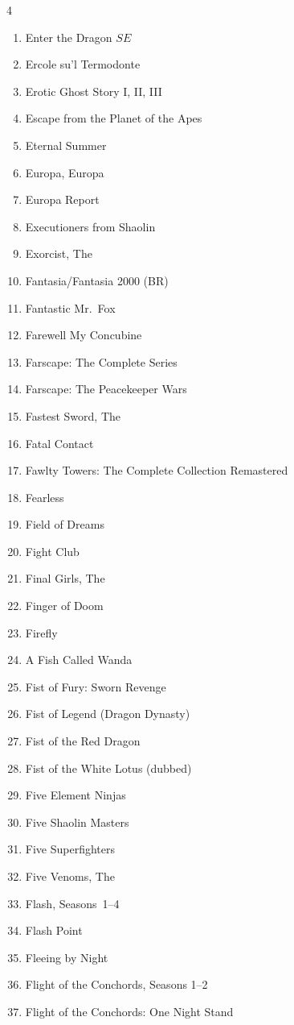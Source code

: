 \documentclass{article}
\newcommand\SE{\(SE\)}
\begin{document}
\begin{multicols}{4}
\begin{enumerate}
\item Enter the Dragon \SE
\item Ercole su'l Termodonte
\item Erotic Ghost Story I, II, III
\item Escape from the Planet of the Apes
\item Eternal Summer
\item Europa, Europa
\item Europa Report
\item Executioners from Shaolin
\item Exorcist, The
\item Fantasia/Fantasia 2000 (BR)
\item Fantastic Mr.~Fox
\item Farewell My Concubine
\item Farscape: The Complete Series
\item Farscape: The Peacekeeper Wars
\item Fastest Sword, The
\item Fatal Contact
\item Fawlty Towers: The Complete Collection Remastered
\item Fearless
\item Field of Dreams
\item Fight Club
\item Final Girls, The
\item Finger of Doom
\item Firefly
\item A Fish Called Wanda
\item Fist of Fury: Sworn Revenge
\item Fist of Legend (Dragon Dynasty)
\item Fist of the Red Dragon
\item Fist of the White Lotus (dubbed)
\item Five Element Ninjas
\item Five Shaolin Masters
\item Five Superfighters
\item Five Venoms, The
\item Flash, Seasons~1--4
\item Flash Point
\item Fleeing by Night
\item Flight of the Conchords, Seasons 1--2
\item Flight of the Conchords: One Night Stand

\end{enumerate}
\end{multicols}
\end{document}
